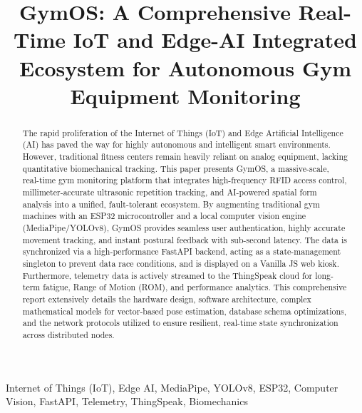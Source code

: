 \documentclass[conference]{IEEEtran}
\begin{document}
\title{GymOS: A Comprehensive Real-Time IoT and Edge-AI Integrated Ecosystem for Autonomous Gym Equipment Monitoring}

\author{
}

\maketitle

\begin{abstract}
The rapid proliferation of the Internet of Things (IoT) and Edge Artificial Intelligence (AI) has paved the way for highly autonomous and intelligent smart environments. However, traditional fitness centers remain heavily reliant on analog equipment, lacking quantitative biomechanical tracking. This paper presents GymOS, a massive-scale, real-time gym monitoring platform that integrates high-frequency RFID access control, millimeter-accurate ultrasonic repetition tracking, and AI-powered spatial form analysis into a unified, fault-tolerant ecosystem. By augmenting traditional gym machines with an ESP32 microcontroller and a local computer vision engine (MediaPipe/YOLOv8), GymOS provides seamless user authentication, highly accurate movement tracking, and instant postural feedback with sub-second latency. The data is synchronized via a high-performance FastAPI backend, acting as a state-management singleton to prevent data race conditions, and is displayed on a Vanilla JS web kiosk. Furthermore, telemetry data is actively streamed to the ThingSpeak cloud for long-term fatigue, Range of Motion (ROM), and performance analytics. This comprehensive report extensively details the hardware design, software architecture, complex mathematical models for vector-based pose estimation, database schema optimizations, and the network protocols utilized to ensure resilient, real-time state synchronization across distributed nodes.
\end{abstract}

\begin{IEEEkeywords}
Internet of Things (IoT), Edge AI, MediaPipe, YOLOv8, ESP32, Computer Vision, FastAPI, Telemetry, ThingSpeak, Biomechanics
\end{IEEEkeywords}

\end{document}
